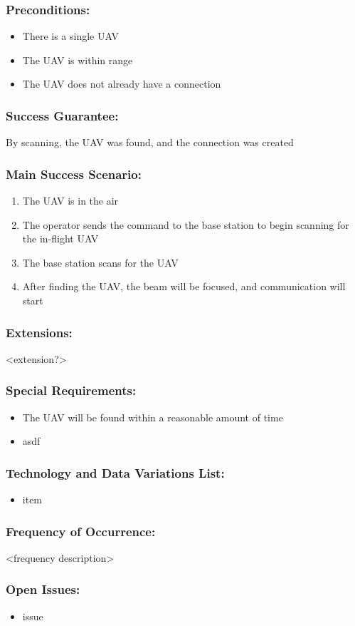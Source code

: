 \documentclass[ProductRequirements.tex]{subfiles}
\begin{document}
		\subsubsection{Preconditions:}
			\begin{itemize}\itemsep1pt
				\item There is a single UAV
				\item The UAV is within range
				\item The UAV does not already have a connection
			\end{itemize}
		\subsubsection{Success Guarantee:}
			By scanning, the UAV was found, and the connection was created
		\subsubsection{Main Success Scenario:}
			\begin{enumerate}\itemsep1pt
				\item The UAV is in the air
				\item The operator sends the command to the base station to begin scanning for the in-flight UAV
				\item The base station scans for the UAV
				\item After finding the UAV, the beam will be focused, and communication will start
			\end{enumerate}
		\subsubsection{Extensions:}
			<extension?>
		\subsubsection{Special Requirements:}
			\begin{itemize}\itemsep1pt
				\item The UAV will be found within a reasonable amount of time
				\item asdf
			\end{itemize}
		\subsubsection{Technology and Data Variations List:}
			\begin{itemize}\itemsep1pt
				\item item
			\end{itemize}
		\subsubsection{Frequency of Occurrence:}
			<frequency description>
		\subsubsection{Open Issues:}
			\begin{itemize}\itemsep1pt
				\item issue
			\end{itemize}		
		
		
		
\end{document}
